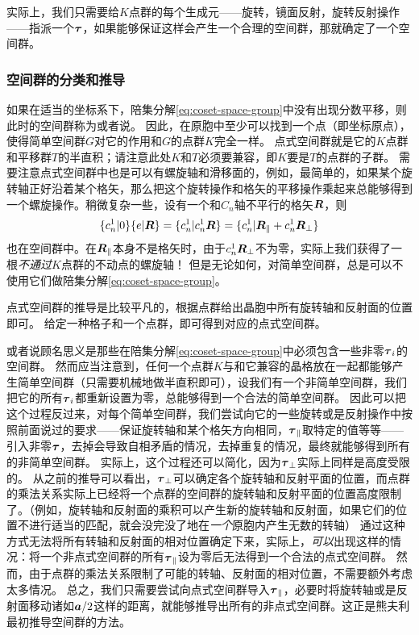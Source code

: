 实际上，我们只需要给$K$点群的每个生成元——旋转，镜面反射，旋转反射操作——指派一个$\vb*{\tau}$，如果能够保证这样会产生一个合理的空间群，那就确定了一个空间群。

\subsubsection{空间群的分类和推导} 

如果在适当的坐标系下，陪集分解\eqref{eq:coset-space-group}中没有出现分数平移，则此时的空间群称为或者说。
因此，在原胞中至少可以找到一个点（即坐标原点），使得简单空间群$G$对它的作用和$G$的点群$K$完全一样。
点式空间群就是它的$K$点群和平移群$T$的半直积；请注意此处$K$和$T$必须要兼容，即$K$要是$T$的点群的子群。
需要注意点式空间群中也是可以有螺旋轴和滑移面的，例如，最简单的，如果某个旋转轴正好沿着某个格矢，那么把这个旋转操作和格矢的平移操作乘起来总能够得到一个螺旋操作。稍微复杂一些，设有一个和$C_n$轴不平行的格矢$\vb*{R}$，则
\[
    \{c_n^1 | 0\} \{ e | \vb*{R} \} = \{ c_n^1 | c_n^1 \vb*{R} \} = \{ c_n^1 | \vb*{R}_\parallel + c_n^1 \vb*{R}_\bot \}
\]
也在空间群中。在$\vb*{R}_\parallel$本身不是格矢时，由于$c_n^1 \vb*{R}_\bot$不为零，实际上我们获得了一根\emph{不通过}$K$点群的不动点的螺旋轴！
但是无论如何，对简单空间群，总是可以不使用它们做陪集分解\eqref{eq:coset-space-group}。

点式空间群的推导是比较平凡的，根据点群给出晶胞中所有旋转轴和反射面的位置即可。
给定一种格子和一个点群，即可得到对应的点式空间群。

或者说顾名思义是那些在陪集分解\eqref{eq:coset-space-group}中必须包含一些非零$\vb*{\tau}_i$的空间群。
然而应当注意到，任何一个点群$K$与和它兼容的晶格放在一起都能够产生简单空间群（只需要机械地做半直积即可），设我们有一个非简单空间群，我们把它的所有$\vb*{\tau}_i$都重新设置为零，总能够得到一个合法的简单空间群。
因此可以把这个过程反过来，对每个简单空间群，我们尝试向它的一些旋转或是反射操作中按照前面说过的要求——保证旋转轴和某个格矢方向相同，$\vb*{\tau}_\parallel$取特定的值等等——引入非零$\vb*{\tau}$，去掉会导致自相矛盾的情况，去掉重复的情况，最终就能够得到所有的非简单空间群。
实际上，这个过程还可以简化，因为$\vb*{\tau}_\bot$实际上同样是高度受限的。
从之前的推导可以看出，$\vb*{\tau}_\bot$可以确定各个旋转轴和反射平面的位置，而点群的乘法关系实际上已经将一个点群的空间群的旋转轴和反射平面的位置高度限制了。（例如，旋转轴和反射面的乘积可以产生新的旋转轴和反射面，如果它们的位置不进行适当的匹配，就会没完没了地在\emph{一个}原胞内产生无数的转轴）
通过这种方式无法将所有转轴和反射面的相对位置确定下来，实际上，\emph{可以}出现这样的情况：将一个非点式空间群的所有$\vb*{\tau}_\parallel$设为零后无法得到一个合法的点式空间群。
然而，由于点群的乘法关系限制了可能的转轴、反射面的相对位置，不需要额外考虑太多情况。
总之，我们只需要尝试向点式空间群导入$\vb*{\tau}_\parallel$，必要时将旋转轴或是反射面移动诸如$\vb*{a}/2$这样的距离，就能够推导出所有的非点式空间群。这正是熊夫利最初推导空间群的方法。

